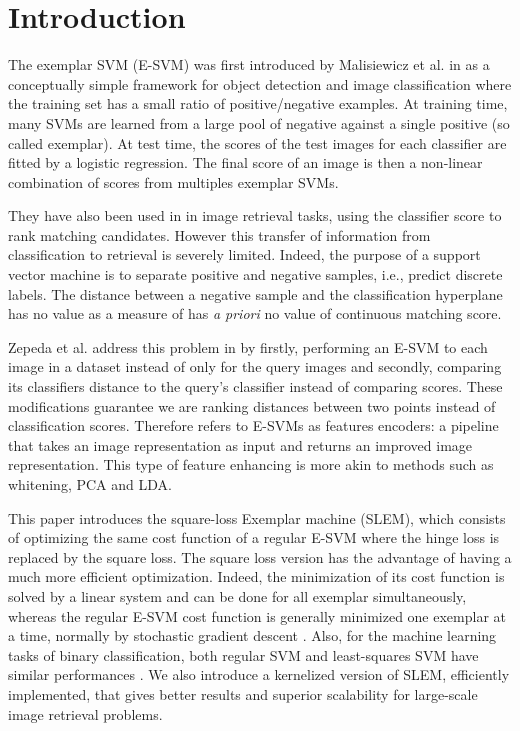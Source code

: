 \section{Introduction}
The exemplar SVM (E-SVM) was first introduced by Malisiewicz et al. in \cite{Efros11} as a conceptually simple framework for object detection and image classification where the training set has a small ratio of positive/negative examples. 
At training time, many SVMs are learned from a large pool of negative against a single positive (so called exemplar). 
At test time, the scores of the test images for each classifier are fitted by a logistic regression. 
The final score of an image is then a non-linear combination of scores from multiples exemplar SVMs.

They have also been used in \cite{Efros12} in image retrieval tasks, using the classifier score to rank matching candidates.
However this transfer of information from classification to retrieval is severely limited. 
Indeed, the purpose of a support vector machine is to separate positive and negative samples, i.e., predict discrete labels. 
The distance between a negative sample and the classification hyperplane has no value as a measure of has \emph{a priori} no value of continuous matching score.

Zepeda et al. address this problem in \cite{ZePe15} by firstly, performing an E-SVM to each image in a dataset instead of only for the query images and secondly, comparing its classifiers distance to the query's classifier instead of comparing scores. 
These modifications guarantee we are ranking distances between two points instead of classification scores.
Therefore \cite{ZePe15} refers to E-SVMs as features encoders: a pipeline that takes an image representation as input and returns an improved image representation. This type of feature enhancing is more akin to methods such as whitening, PCA and LDA.

This paper introduces the square-loss Exemplar machine (SLEM), which consists of optimizing the same cost function of a regular E-SVM where the hinge loss is replaced by the square loss. 
The square loss version has the advantage of having a much more efficient optimization. Indeed, the minimization of its cost function is solved by a linear system and can be done for all exemplar simultaneously, whereas the regular E-SVM cost function is generally minimized one exemplar at a time, normally by stochastic gradient descent \cite{bottou10}.
Also, for the machine learning tasks of binary classification, both regular SVM and least-squares SVM have similar performances \cite{YeXi07}.
We also introduce a kernelized version of SLEM, efficiently implemented, that gives better results and superior scalability for large-scale image retrieval problems.
